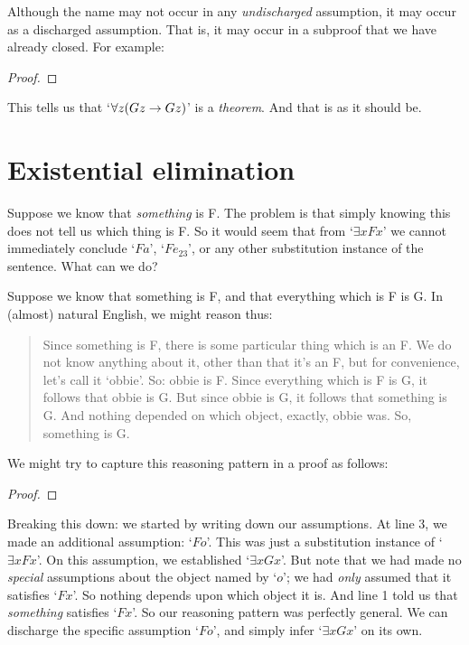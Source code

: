Although the name may not occur in any \emph{undischarged} assumption, it may occur as a discharged assumption. That is, it may occur in a subproof that we have already closed. For example:
\begin{proof}
	\open
	\close
\end{proof}
This tells us that `$\forall z (Gz \rightarrow Gz)$' is a \emph{theorem}. And that is as it should be.

\section{Existential elimination}
Suppose we know that \emph{something} is F. The problem is that simply knowing this does not tell us which thing is F. So it would seem that from `$\exists x Fx$' we cannot immediately conclude `$Fa$', `$Fe_{23}$', or any other substitution instance of the sentence. What can we do?

Suppose we know that something is F, and that everything which is F is G. In (almost) natural English, we might reason thus:
	\begin{quote}
		Since something is F, there is some particular thing which is an F. We do not know anything about it, other than that it's an F, but for convenience, let's call it `obbie'. So: obbie is F. Since everything which is F is G, it follows that obbie is G. But since obbie is G, it follows that something is G. And nothing depended on which object, exactly, obbie was. So, something is G.
	\end{quote}
We might try to capture this reasoning pattern in a proof as follows:
\begin{proof}
	\open
		 
	\close
\end{proof}\noindent
Breaking this down: we started by writing down our assumptions. At line 3, we made an additional assumption: `$Fo$'. This was just a substitution instance of `$\exists x Fx$'. On this assumption, we established `$\exists x Gx$'. But note that we had made no \emph{special} assumptions about the object named by `$o$'; we had \emph{only} assumed that it satisfies `$Fx$'. So nothing depends upon which object it is. And line 1 told us that \emph{something} satisfies `$Fx$'. So our reasoning pattern was perfectly general. We can discharge the specific assumption `$Fo$', and simply infer `$\exists x Gx$' on its own.

